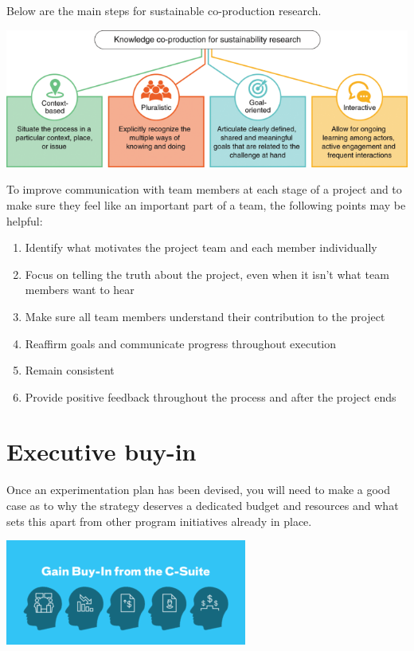 \documentclass[]{book}
\providecommand{\tightlist}{%
  \setlength{\itemsep}{0pt}\setlength{\parskip}{0pt}}
\begin{document}
Below are the main steps for sustainable co-production research.

\includegraphics{fig/team-co-production.png}

To improve communication with team members at each stage of a project and to make sure they feel like an important part of a team, the following points may be helpful:

\begin{enumerate}
\def\labelenumi{\arabic{enumi}.}
\tightlist
\item
  Identify what motivates the project team and each member individually
\item
  Focus on telling the truth about the project, even when it isn't what team members want to hear
\item
  Make sure all team members understand their contribution to the project
\item
  Reaffirm goals and communicate progress throughout execution
\item
  Remain consistent
\item
  Provide positive feedback throughout the process and after the project ends
\end{enumerate}

\hypertarget{executive-buy-in}{%
\section{Executive buy-in}\label{executive-buy-in}}

Once an experimentation plan has been devised, you will need to make a good case as to why the strategy deserves a dedicated budget and resources and what sets this apart from other program initiatives already in place.

\includegraphics{fig/buy-in.png}
\end{document}
